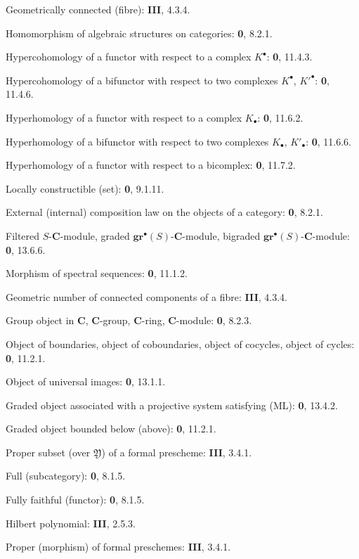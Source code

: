 \begin{flushleft}
Geometrically connected (fibre): \textbf{III}, 4.3.4.

Homomorphism of algebraic structures on categories: \textbf{0}, 8.2.1.

Hypercohomology of a functor with respect to a complex $K^\bullet$:
\textbf{0}, 11.4.3.

Hypercohomology of a bifunctor with respect to two complexes
$K^\bullet$, $K'^{\bullet}$: \textbf{0}, 11.4.6.

Hyperhomology of a functor with respect to a complex $K_\bullet$:
\textbf{0}, 11.6.2.

Hyperhomology of a bifunctor with respect to two complexes $K_\bullet$,
$K'_\bullet$: \textbf{0}, 11.6.6.

Hyperhomology of a functor with respect to a bicomplex: \textbf{0}, 11.7.2.

Locally constructible (set): \textbf{0}, 9.1.11.

External (internal) composition law on the objects of a category: \textbf{0}, 8.2.1.


Filtered $S$-$\boldsymbol{C}$-module, graded $\mathbf{gr}^\bullet(S)$-$\boldsymbol{C}$-module,
bigraded $\mathbf{gr}^\bullet(S)$-$\boldsymbol{C}$-module: \textbf{0}, 13.6.6.

Morphism of spectral sequences: \textbf{0}, 11.1.2.

Geometric number of connected components of a fibre: \textbf{III}, 4.3.4.

Group object in $\boldsymbol{C}$, $\boldsymbol{C}$-group, $\boldsymbol{C}$-ring, $\boldsymbol{C}$-module: \textbf{0}, 8.2.3.

Object of boundaries, object of coboundaries, object of cocycles, object of
cycles: \textbf{0}, 11.2.1.

Object of universal images: \textbf{0}, 13.1.1.

Graded object associated with a projective system satisfying (ML): \textbf{0}, 13.4.2.

Graded object bounded below (above): \textbf{0}, 11.2.1.

Proper subset (over $\mathfrak Y$) of a formal prescheme: \textbf{III}, 3.4.1.

Full (subcategory): \textbf{0}, 8.1.5.

Fully faithful (functor): \textbf{0}, 8.1.5.

Hilbert polynomial: \textbf{III}, 2.5.3.

Proper (morphism) of formal preschemes: \textbf{III}, 3.4.1.


\end{flushleft}
